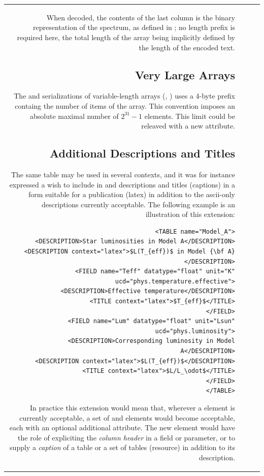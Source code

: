 \begin{tabular}{RRCp{0.8\textwidth}}
\begin{center}
{\noindent 
When decoded, the contents of the last column is the binary representation
of the spectrum, as defined in ;
no length prefix is required here, the total length of the array being
implicitly defined by the length of the encoded text.

\subsection{Very Large Arrays}
The  and  serializations of variable-length arrays 
(, ) uses a 4-byte prefix containg the number of
items of the array. This convention imposes an absolute maximal
number of $2^{31}-1$ elements. This limit could be releaved 
with a new  attribute.

\subsection{Additional Descriptions and Titles}
\label{sec:addesc}
The same table may be used in several contexts, and it was for
instance expressed a wish to include in   and
 descriptions and titles (captions) in a form
suitable for a publication (latex)
in addition to the ascii-only descriptions currently acceptable.
The following example is an illustration of this extension:
\begin{verbatim}
<TABLE name="Model_A">
  <DESCRIPTION>Star luminosities in Model A</DESCRIPTION>
  <DESCRIPTION context="latex">$L(T_{eff})$ in Model {\bf A}</DESCRIPTION>
  <FIELD name="Teff" datatype="float" unit="K" ucd="phys.temperature.effective">
     <DESCRIPTION>Effective temperature</DESCRIPTION>
     <TITLE context="latex">$T_{eff}$</TITLE>
  </FIELD>
  <FIELD name="Lum" datatype="float" unit="Lsun" ucd="phys.luminosity">
     <DESCRIPTION>Corresponding luminosity in Model A</DESCRIPTION>
     <DESCRIPTION context="latex">$L(T_{eff})$</DESCRIPTION>
     <TITLE context="latex">$L/L_\odot$</TITLE>
  </FIELD>
</TABLE>
\end{verbatim}

In practice this extension would mean that, wherever a 
element is currently acceptable, a set of  and
 elements would become acceptable, each with an optional
 additional attribute. The new  element
would have the role of expliciting the {\em column header} in a
field or parameter, or to supply a {\em caption} of a table or
a set of tables (resource) in addition to its description.

}
\end{center}
\end{tabular}
